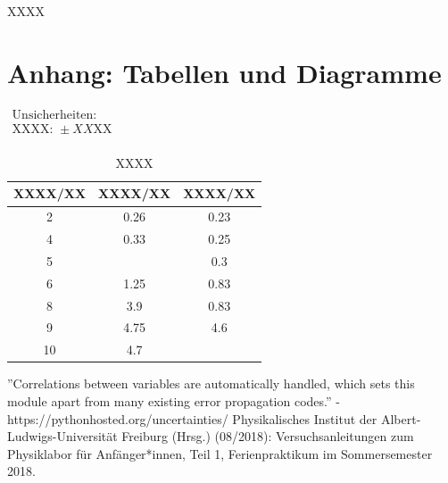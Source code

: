 \documentclass[11pt,a4paper]{article}
\begin{document}
XXXX

\pagebreak

\section{Anhang: Tabellen und Diagramme}

\begin{table}[h]
\centering
\caption{XXXX} \vspace{11pt}
$\begin{array}{l}
\textrm{Unsicherheiten:}\\
\textrm{XXXX: } \pm XX \textrm{XX}\\
\end{array}$
\begin{tabular}{ccc}
\toprule
\textrm{XXXX}/\textrm{XX} & \textrm{XXXX}/\textrm{XX} & \textrm{XXXX}/\textrm{XX} \\
\midrule 
2 & 0.26 & 0.23\\
\hline
4 & 0.33 & 0.25\\
\hline 
5 & & 0.3\\
\hline 
6 & 1.25 & 0.83\\
\hline 
8 & 3.9 & 0.83\\ 
\hline
9 & 4.75 & 4.6\\ 
\hline
10 & 4.7 &\\ 
\bottomrule
\end{tabular}
\label{Tab:X}
\end{table}


\begin{thebibliography}{9}
''Correlations between variables are automatically handled, which sets this module apart from many existing error propagation codes.'' - https://pythonhosted.org/uncertainties/
 Physikalisches Institut der Albert-Ludwigs-Universität Freiburg (Hrsg.) (08/2018): Versuchsanleitungen zum Physiklabor für Anfänger*innen, Teil 1, Ferienpraktikum im Sommersemester 2018.
\end{thebibliography}
\end{document}

